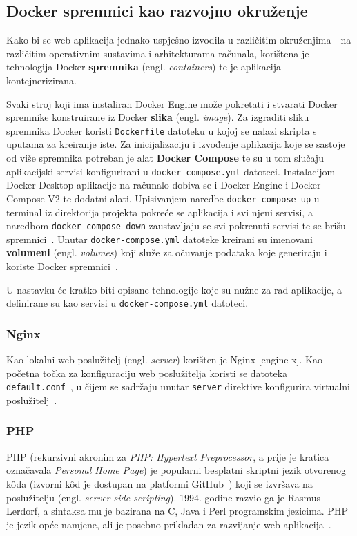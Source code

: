 \subsection{Docker spremnici kao razvojno okruženje}
Kako bi se web aplikacija jednako uspješno izvodila u različitim okruženjima - na različitim operativnim sustavima i arhitekturama računala, korištena je tehnologija Docker \textbf{spremnika} (engl. \textit{containers}) te je aplikacija kontejnerizirana.

Svaki stroj koji ima instaliran Docker Engine može pokretati i stvarati Docker spremnike konstruirane iz Docker \textbf{slika} (engl. \textit{image}). Za izgraditi sliku spremnika Docker koristi \texttt{Dockerfile} datoteku u kojoj se nalazi skripta s uputama za kreiranje iste. Za inicijalizaciju i izvođenje aplikacija koje se sastoje od više spremnika potreban je alat \textbf{Docker Compose} te su u tom slučaju aplikacijski servisi konfigurirani u \texttt{docker-compose.yml} datoteci. Instalacijom Docker Desktop aplikacije na računalo dobiva se i Docker Engine i Docker Compose V2 te dodatni alati. Upisivanjem naredbe \texttt{docker compose up} u terminal iz direktorija projekta pokreće se aplikacija i svi njeni servisi, a naredbom \texttt{docker compose down} zaustavljaju se svi pokrenuti servisi te se brišu spremnici~\cite{dockerCompose}. Unutar \texttt{docker-compose.yml} datoteke kreirani su imenovani \textbf{volumeni} (engl. \textit{volumes}) koji služe za očuvanje podataka koje generiraju i koriste Docker spremnici~\cite{dockerVolumes}.

U nastavku će kratko biti opisane tehnologije koje su nužne za rad aplikacije, a definirane su kao servisi u \texttt{docker-compose.yml} datoteci.

\subsubsection{Nginx}
Kao lokalni web poslužitelj (engl. \textit{server}) korišten je Nginx [engine x]. Kao početna točka za konfiguraciju web poslužitelja koristi se datoteka \texttt{default.conf}~\cite{nginxDeployment}, u čijem se sadržaju unutar \texttt{server} direktive konfigurira virtualni poslužitelj~\cite{nginxServer}.

\subsubsection{PHP}
PHP (rekurzivni akronim za  \textit{PHP: Hypertext Preprocessor}, a prije je kratica označavala \textit{Personal Home Page}) je popularni besplatni skriptni jezik otvorenog k\^oda (izvorni k\^od je dostupan na platformi GitHub~\cite{phpGitHub}) koji se izvršava na poslužitelju (engl. \textit{server-side scripting}). 1994. godine razvio ga je  Rasmus Lerdorf, a sintaksa mu je bazirana na C, Java i Perl programskim jezicima. PHP je jezik opće namjene, ali je posebno prikladan za razvijanje web aplikacija~\cite{Brekalo}.


